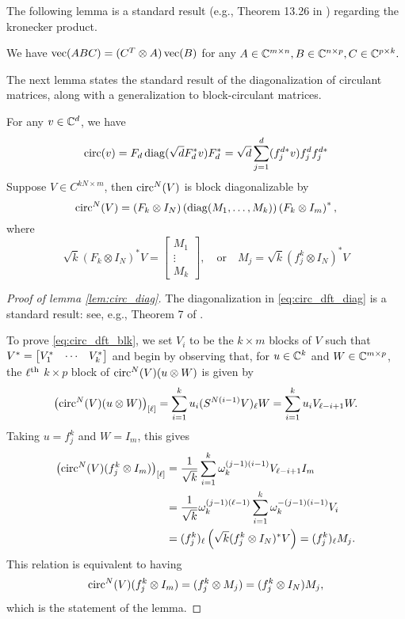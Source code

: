 The following lemma is a standard result (e.g., Theorem 13.26 in \cite{laub2004matrix}) regarding the kronecker product.

\begin{lemma}
  We have $\operatorname{vec}(A B C) = (C^T \otimes A) \operatorname{vec}(B)$ for any $A \in \mathbb{C}^{m \times n}, B \in \mathbb{C}^{n \times p}, C \in \mathbb{C}^{p \times k}.$
  \label{lem:kronvec}
\end{lemma}
The next lemma states the standard result of the diagonalization of circulant matrices, along with a generalization to block-circulant matrices.
\begin{lemma}
  For any $v \in \mathbb{C}^d$, we have \begin{equation} \operatorname{circ}(v) = F_d \operatorname{diag}(\sqrt{d} F_d^* v) F_d^* = \sqrt{d} \sum_{j = 1}^d (f_j^{d *} v) f_j^d f_j^{d *} \label{eq:circ_dft_diag} \end{equation}  
  Suppose $V \in C^{k N \times m}$, then $\operatorname{circ}^N(V)$ is block diagonalizable by \begin{equation} \operatorname{circ}^N(V) = \left(F_k \otimes I_N\right) \left(\operatorname{diag}(M_1, \ldots, M_k)\right) \left(F_k \otimes I_m\right)^*,  \label{eq:circ_dft_blk} \end{equation} where \begin{equation} \sqrt{k}\left(F_k \otimes I_N\right)^* V = \begin{bmatrix} M_1 \\ \vdots \\ M_k \end{bmatrix}, \quad \text{or} \quad M_j = \sqrt{k} (f_j^k \otimes I_N)^* V \label{eq:M_ell}\end{equation} \label{lem:circ_diag}
\end{lemma}

\begin{proof}[Proof of lemma \ref{lem:circ_diag}]
  The diagonalization in \eqref{eq:circ_dft_diag} is a standard result: see, e.g., Theorem 7 of \cite{gray2006circulant}.

  To prove \eqref{eq:circ_dft_blk}, we set $V_i$ to be the $k \times m$ blocks of $V$ such that $V^* = \begin{bmatrix} V^*_{1} & \cdots & V^*_{k} \end{bmatrix}$ and begin by observing that, for $u \in \mathbb{C}^k$ and $W \in \mathbb{C}^{m \times p}$, the $\ell^{\text{th}}$ $k \times p$ block of $\operatorname{circ}^N(V)(u \otimes W)$ is given by \[\left(\operatorname{circ}^N(V)(u \otimes W)\right)_{[\ell]} = \sum_{i = 1}^k u_i (S^{N (i - 1)}V)_\ell W = \sum_{i = 1}^k u_i V_{\ell - i + 1} W.\]  Taking $u = f_j^k$ and $W = I_m$, this gives \begin{align*} \left(\operatorname{circ}^N(V)(f_j^k \otimes I_m)\right)_{[\ell]} &= \frac{1}{\sqrt{k}}\sum_{i = 1}^k \omega_k^{(j - 1) (i - 1)} V_{\ell - i + 1} I_m \\ &= \frac{1}{\sqrt{k}} \omega_k^{(j - 1) (\ell - 1)} \sum_{i = 1}^k \omega_k^{-(j - 1)(i - 1)} V_i \\ &= (f_j^k)_\ell \left(\sqrt{k} (f_j^k \otimes I_N)^* V \right) = (f_j^k)_\ell M_j. \end{align*}  This relation is equivalent to having \[\operatorname{circ}^N(V) (f_j^k \otimes I_m) = (f_j^k \otimes M_j) = (f_j^k \otimes I_N) M_j,\] which is the statement of the lemma.
\end{proof}

